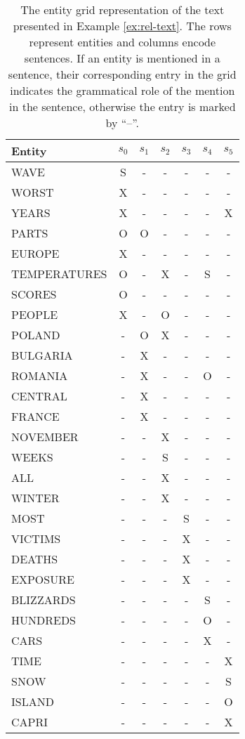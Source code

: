 \begin{table}[!ht]	
	\begin{center}
		\begin{tabular}{lcccccc}
			\toprule
			Entity  		& $s_0$ & $s_1$ & $s_2$ & $s_3$ & $s_4$ & $s_5$ 
			\\
			\midrule
			WAVE 			& S & - & - & - & - & - \\
			WORST 			& X & - & - & - & - & - \\
			YEARS 			& X & - & - & - & - & X \\
			PARTS 			& O & O & - & - & - & - \\
			EUROPE  		& X & - & - & - & - & - \\
			TEMPERATURES  	& O & - & X & - & S & - \\
			SCORES  		& O & - & - & - & - & - \\
			PEOPLE  		& X & - & O & - & - & - \\
			POLAND 			& - & O & X & - & - & - \\
			BULGARIA  		& - & X & - & - & - & - \\
			ROMANIA  		& - & X & - & - & O & - \\
			CENTRAL  		& - & X & - & - & - & - \\
			FRANCE  		& - & X & - & - & - & - \\
			NOVEMBER  		& - & - & X & - & - & - \\
			WEEKS 			& - & - & S & - & - & - \\
			ALL 			& - & - & X & - & - & - \\
			WINTER  		& - & - & X & - & - & - \\
			MOST 			& - & - & - & S & - & - \\
			VICTIMS  		& - & - & - & X & - & - \\
			DEATHS 			& - & - & - & X & - & - \\
			EXPOSURE  		& - & - & - & X & - & - \\
			BLIZZARDS  		& - & - & - & - & S & - \\
			HUNDREDS  		& - & - & - & - & O & - \\
			CARS  			& - & - & - & - & X & - \\
			TIME  			& - & - & - & - & - & X \\
			SNOW  			& - & - & - & - & - & S \\
			ISLAND 			& - & - & - & - & - & O \\
			CAPRI 			& - & - & - & - & - & X \\
			\bottomrule
		\end{tabular}
		\caption{The entity grid representation of the text presented in Example \ref{ex:rel-text}. The rows represent entities and columns encode sentences. 
		If an entity is mentioned in a sentence, their corresponding entry in the grid indicates the grammatical role of the mention in the sentence, otherwise the entry is marked by ``--''.} 
		\label{tab:rel-egrid}
	\end{center}
\end{table}

